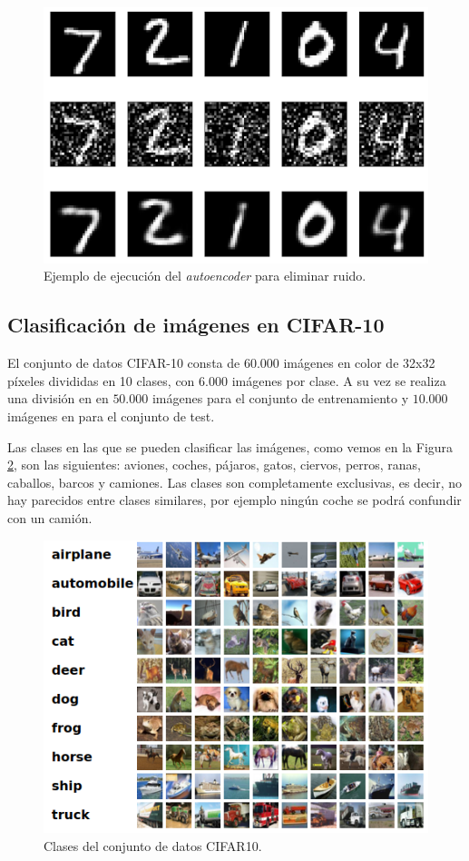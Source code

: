 \documentclass[
  a4paper,
  12pt,
  spanish,
]{scrartcl}
\theoremstyle{teorema-style}
\begin{document}
\begin{enumerate}
\begin{figure}[h]
  \centering
  \includegraphics[width=.7\textwidth]{img/autoencoder_ex2}
  \caption{Ejemplo de ejecución del \textit{autoencoder} para eliminar ruido.}
  \label{fig:autoencoder_ex2}
\end{figure}

\subsection{Clasificación de imágenes en CIFAR-10}

El conjunto de datos CIFAR-10 \parencite{rizhevsky_learning_2009} consta de $60.000$ imágenes en color de 32x32 píxeles divididas en 10 clases, con $6.000$ imágenes por clase. A su vez se realiza una división en en $50.000$ imágenes para el conjunto de entrenamiento y $10.000$ imágenes en para el conjunto de test.

Las clases en las que se pueden clasificar las imágenes, como vemos en la Figura \ref{fig:cifar10}, son las siguientes: aviones, coches, pájaros, gatos, ciervos, perros, ranas, caballos, barcos y camiones. Las clases son completamente exclusivas, es decir, no hay parecidos entre clases similares, por ejemplo ningún coche se podrá confundir con un camión.

\begin{figure}[h]
  \centering
  \includegraphics[width=.7\textwidth]{img/cifar10}
  \caption{Clases del conjunto de datos CIFAR10.}
  \label{fig:cifar10}
\end{figure}


\end{enumerate}
\end{document}
